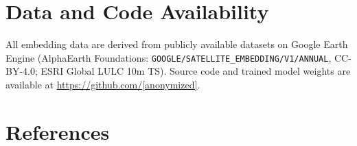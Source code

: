 \documentclass{article}
\begin{document}
\section*{Data and Code Availability}
All embedding data are derived from publicly available datasets on Google Earth Engine (AlphaEarth Foundations: \texttt{GOOGLE/SATELLITE\_EMBEDDING/V1/ANNUAL}, CC-BY-4.0; ESRI Global LULC 10m TS). Source code and trained model weights are available at \url{https://github.com/[anonymized]}.


\section*{References}
\end{document}

